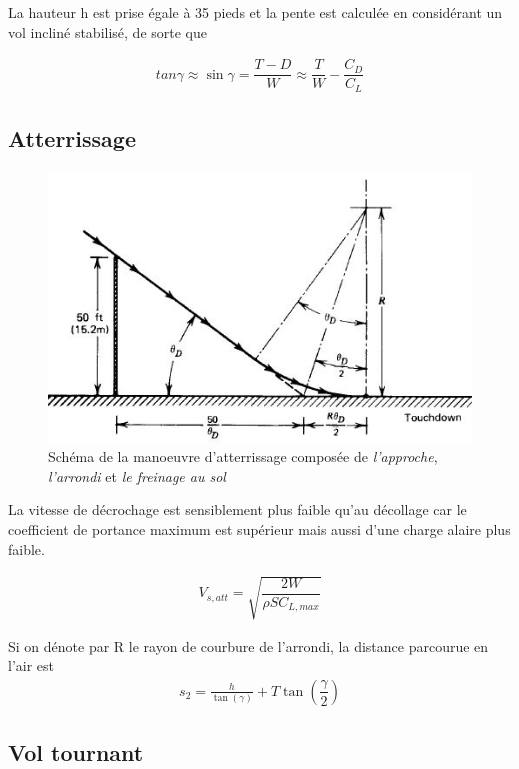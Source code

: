 \documentclass{report}
\begin{document}
La hauteur h est prise égale à 35 pieds et la pente est calculée en considérant un vol incliné stabilisé, de sorte que

\begin{eqnarray}
tan \gamma\approx \sin\gamma = \dfrac{T-D}{W}\approx\dfrac{T}{W}-\dfrac{C_D}{C_L}
\end{eqnarray}


\subsection{Atterrissage}

\begin{figure}[h!]
    \centering
    \includegraphics{15.JPG}
    \caption{Schéma de la manoeuvre d'atterrissage composée de \textit{l'approche}, \textit{l'arrondi} et \textit{le freinage au sol}}
    \label{15}
\end{figure}

La vitesse de décrochage est sensiblement plus faible qu'au décollage car le coefficient de portance maximum est supérieur mais aussi d'une charge alaire plus faible.

\begin{eqnarray}
V_{s,att} = \sqrt{\dfrac{2W}{\rho SC_{L,max}}}
\end{eqnarray}

Si on dénote par R le rayon de courbure de l'arrondi, la distance parcourue en l'air est
\begin{eqnarray}
s_2=\frac{h}{\tan(\gamma)}+T \tan\left(\dfrac{\gamma}{2}\right)
\end{eqnarray}

\subsection{Vol tournant}
\end{document}

